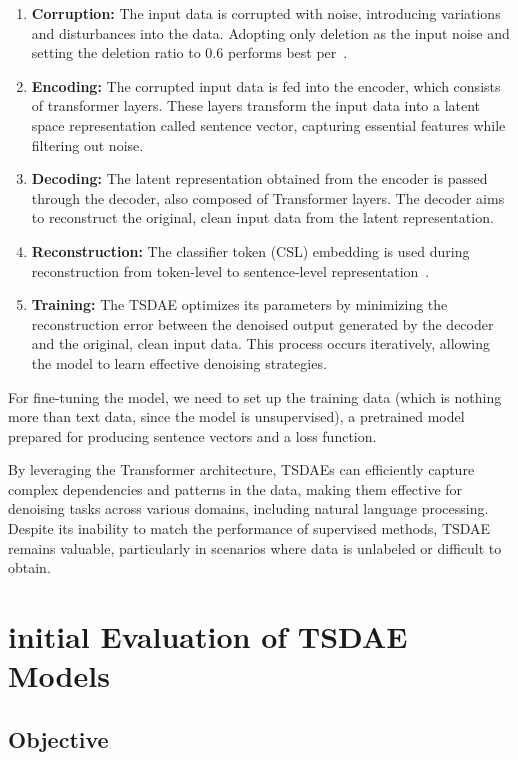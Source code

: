 \documentclass[fleqn,moreauthors,10pt]{ds_report}
\begin{document}
\begin{enumerate}
    \item \textbf{Corruption:} The input data is corrupted with noise, introducing variations and disturbances into the data. Adopting only deletion as the input noise and setting the deletion ratio to 0.6 performs best per~\cite{wang2021tsdae}.
    \item \textbf{Encoding:} The corrupted input data is fed into the encoder, which consists of transformer layers. These layers transform the input data into a latent space representation called sentence vector, capturing essential features while filtering out noise.
    \item \textbf{Decoding:} The latent representation obtained from the encoder is passed through the decoder, also composed of Transformer layers. The decoder aims to reconstruct the original, clean input data from the latent representation.
    \item \textbf{Reconstruction:} The classifier token (CSL) embedding is used during reconstruction from token-level to sentence-level representation~\cite{pinecone_2021}.
    \item \textbf{Training:} The TSDAE optimizes its parameters by minimizing the reconstruction error between the denoised output generated by the decoder and the original, clean input data. This process occurs iteratively, allowing the model to learn effective denoising strategies.
\end{enumerate}

For fine-tuning the model, we need to set up the training data (which is nothing more than text data, since the model is unsupervised), a pretrained model prepared for producing sentence vectors and a loss function.

By leveraging the Transformer architecture, TSDAEs can efficiently capture complex dependencies and patterns in the data, making them effective for denoising tasks across various domains, including natural language processing. Despite its inability to match the performance of supervised methods, TSDAE remains valuable, particularly in scenarios where data is unlabeled or difficult to obtain.

\section*{initial Evaluation of TSDAE Models}

\subsection*{Objective}
\end{document}
